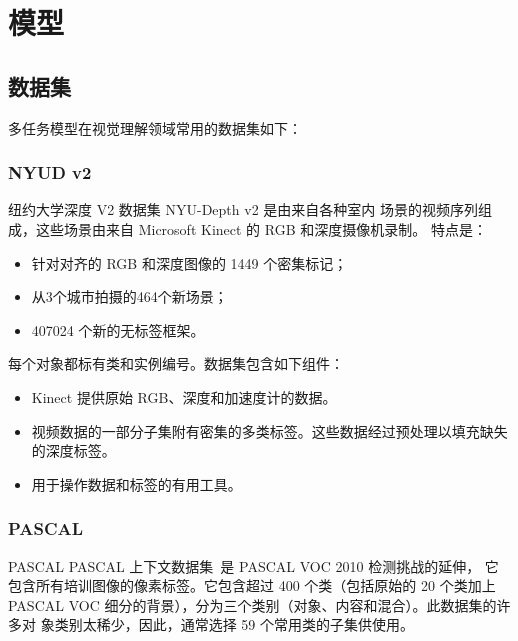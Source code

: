 \documentclass[../main]{subfiles}
\begin{document}
\mode*

\chapter{模型}%
\label{cha:model}

\section{数据集}%
\label{sec:dataset}

多任务模型在视觉理解领域常用的数据集如下：

\subsection{NYUD v2}%
\label{sub:nyud}

纽约大学深度 V2 数据集 NYU-Depth v2\cite{couprie2013indoor} 是由来自各种室内
场景的视频序列组成，这些场景由来自 Microsoft Kinect 的 RGB 和深度摄像机录制。
特点是：

\begin{itemize}
  \item 针对对齐的 RGB 和深度图像的 1449 个密集标记；
  \item 从3个城市拍摄的464个新场景；
  \item 407024 个新的无标签框架。
\end{itemize}

每个对象都标有类和实例编号。数据集包含如下组件：

\begin{itemize}
  \item Kinect 提供原始 RGB、深度和加速度计的数据。
  \item 视频数据的一部分子集附有密集的多类标签。这些数据经过预处理以填充缺失的深度标签。
  \item 用于操作数据和标签的有用工具。
\end{itemize}

\subsection{PASCAL}%
\label{sub:pascal}

\begin{frame}{PASCAL}
  PASCAL 上下文数据集~\cite{Everingham2010}是 PASCAL VOC 2010 检测挑战的延伸，
  它包含所有培训图像的像素标签。它包含超过 400 个类（包括原始的 20 个类加上
  PASCAL VOC 细分的背景），分为三个类别（对象、内容和混合）。此数据集的许多对
  象类别太稀少，因此，通常选择 59 个常用类的子集供使用。
\end{frame}
\end{document}
